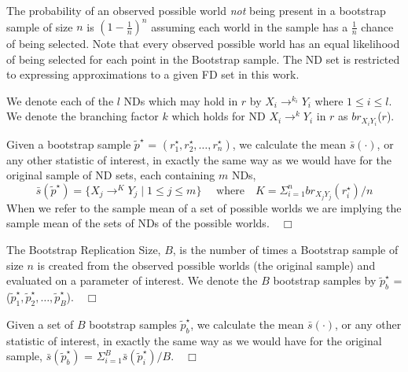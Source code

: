 The probability of an observed possible world {\em not} being
present in a bootstrap sample of size $n$ is $(1 - \frac{1}{n})^n$
assuming each world in the sample has a $\frac{1}{n}$ chance of being
selected.  Note that
every observed possible world has an equal likelihood of being 
selected for each point in the Bootstrap sample. The ND set is
restricted to expressing approximations to a given FD set in this work.

\medskip

We denote each of the $l$ NDs which may hold in
$r$ by $X_i \to^{k_i} Y_i$ where $1 \le i \le l$.
We denote the branching factor $k$ which holds for ND $X_i \to^k Y_i$ in
$r$ as $br_{X_iY_i}$($r$).  
\begin{definition}
\begin{rm}
Given a bootstrap sample {\bf $\tilde{p}^\star$} = \linebreak[4] $(r_1^\star, r_2^\star, \ldots, r_n^\star )$, we calculate the
mean $\bar{s}(\cdot)$, or any other statistic of interest, in exactly the same
way as we would have for the original sample of ND sets, each containing $m$ NDs, 
\[\bar{s}(\tilde{p}^\star) = \{ X_j \to^K Y_j \mid 1 \le j \le m \}\quad\mbox{ where}\quad K = {\Sigma_{i = 1}^n br_{X_jY_j}(r_i^\star)/n}\]
When we refer to the sample mean of a set of possible worlds we are implying
the sample mean of the sets of NDs of the possible worlds.$\quad\Box$
\end{rm}
\end{definition}


\begin{definition}
\begin{rm}
The Bootstrap Replication Size, $B$, is the number of times a Bootstrap
sample of size $n$ is created from the observed possible worlds (the
original sample) and evaluated on a parameter of interest. We denote the $B$ bootstrap samples by $\tilde{p}^\star_b$ = ({\bf $\tilde{p}^\star_1, \tilde{p}^\star_2, \ldots, \tilde{p}^\star_B$}).$\quad\Box$
\end{rm}
\end{definition}

\begin{definition}
\begin{rm}
Given a set of $B$ bootstrap samples $\tilde{p}^\star_b$,  
we calculate the mean $\bar{s}(\cdot)$, or any other statistic of 
interest, in exactly the same
way as we would have for the original sample, 
$\bar{s}(\tilde{p}^\star_b)$  = $\Sigma_{i = 1}^B \bar{s}(\tilde{p}^\star_i) / B$.$\quad\Box$
\end{rm}
\end{definition}


